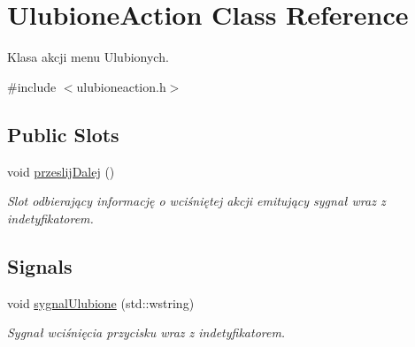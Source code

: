 \hypertarget{class_ulubione_action}{
\section{UlubioneAction Class Reference}
\label{class_ulubione_action}
}


Klasa akcji menu Ulubionych.  




{\ttfamily \#include $<$ulubioneaction.h$>$}

\subsection*{Public Slots}
\begin{DoxyCompactItemize}
\item 
\hypertarget{class_ulubione_action_aa41010fb7799b8962dc713542ace1a91}{
void \hyperlink{class_ulubione_action_aa41010fb7799b8962dc713542ace1a91}{przeslijDalej} ()}
\label{class_ulubione_action_aa41010fb7799b8962dc713542ace1a91}

\begin{DoxyCompactList}\small\item\em Slot odbierający informację o wciśniętej akcji emitujący sygnał wraz z indetyfikatorem. \item\end{DoxyCompactList}\end{DoxyCompactItemize}
\subsection*{Signals}
\begin{DoxyCompactItemize}
\item 
\hypertarget{class_ulubione_action_a4884b96c9fe0d4ff8ba498e6797d4561}{
void \hyperlink{class_ulubione_action_a4884b96c9fe0d4ff8ba498e6797d4561}{sygnalUlubione} (std::wstring)}
\label{class_ulubione_action_a4884b96c9fe0d4ff8ba498e6797d4561}

\begin{DoxyCompactList}\small\item\em Sygnał wciśnięcia przycisku wraz z indetyfikatorem. \item\end{DoxyCompactList}\end{DoxyCompactItemize}
